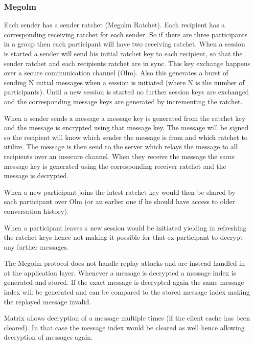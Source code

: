 \subsubsection{Megolm}

Each sender has a sender ratchet (Megolm Ratchet). Each recipient has a corresponding receiving ratchet for each sender. So if there are three participants in a group then each participant will have two receiving ratchet. When a session is started a sender will send his initial ratchet key to each recipient, so that the sender ratchet and each recipients ratchet are in sync. This key exchange happens over a secure communication channel (Olm). Also this generates a burst of sending N initial messages when a session is initiated (where N is the number of participants). Until a new session is started no further session keys are exchanged and the corresponding message keys are generated by incrementing the ratchet.

When a sender sends a message a message key is generated from the ratchet key and the message is encrypted using that message key. The message will be signed so the recipient will know which sender the message is from and which ratchet to utilize. %
The message  is then send to the server which relays the message to all recipients over an insecure channel. When they receive the message the same message key is generated using the corresponding receiver ratchet and the message is decrypted. 

When a new participant joins the latest ratchet key would then be shared by each participant over Olm (or an earlier one if he should have access to older conversation history). 

When a participant leaves a new session would be initiated yielding in refreshing the ratchet keys hence not making it possible for that ex-participant to decrypt any further messages.


The Megolm protocol does not handle replay attacks and are instead handled in at the application layer. Whenever a message is decrypted a message index is generated and stored. If the exact message is decrypted again the same message index will be generated and can be compared to the stored message index making the replayed message invalid. 

Matrix allows decryption of a message multiple times (if the client cache has been cleared). In that case the message index would be cleared as well hence allowing decryption of messages again.


